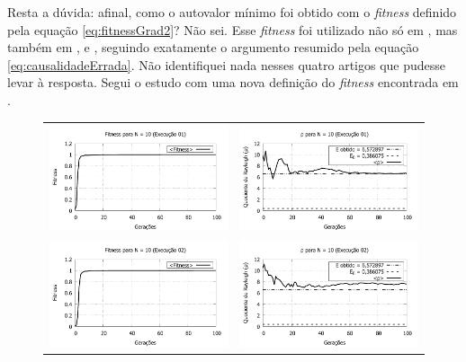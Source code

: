 Resta a dúvida: afinal, como o autovalor mínimo foi obtido com o \textit{fitness} definido pela equação \ref{eq:fitnessGrad2}? Não sei. Esse \textit{fitness} foi utilizado não só em \cite{metodo2004}, mas também em \cite{metodo2006}, \cite{metodo2008} e \cite{metodo2009}, seguindo exatamente o argumento resumido pela equação \ref{eq:causalidadeErrada}. Não identifiquei nada nesses quatro artigos que pudesse levar à resposta. Segui o estudo com uma nova definição do \textit{fitness} encontrada em \cite{metodo2011}.

\newpage
\begin{figure}[p]
\centering
  \begin{tabular}{@{}cc@{}}
    \includegraphics[width=.45\textwidth]{figs/resultados/fitnessGrad/N10_01_fitness.pdf} &
    \includegraphics[width=.45\textwidth]{figs/resultados/fitnessGrad/N10_01_rho.pdf}   \\
		\includegraphics[width=.45\textwidth]{figs/resultados/fitnessGrad/N10_02_fitness.pdf} &
    \includegraphics[width=.45\textwidth]{figs/resultados/fitnessGrad/N10_02_rho.pdf}   \\

\end{tabular}
\end{figure}

